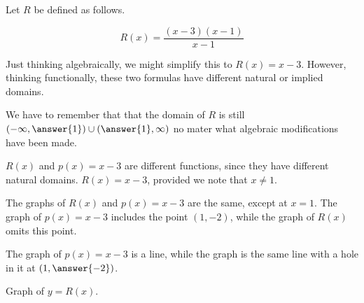 \documentclass{ximera}
\begin{document}
\begin{example}

Let $R$ be defined as follows.


\[   R(x) = \frac{(x-3)(x-1)}{x-1}            \]


Just thinking algebraically, we might simplify this to $R(x) = x-3$. However, thinking functionally, these two formulas have different natural or implied domains.


We have to remember that that the domain of $R$ is still $\left( -\infty, \answer{1} \right) \cup \left( \answer{1},\infty \right)$ no mater what algebraic modifications have been made.

$R(x)$ and $p(x) = x-3$ are different functions, since they have different natural domains. $R(x) = x - 3$, provided we note that $x \ne 1$.


The graphs of $R(x)$ and $p(x) = x-3$ are the same, except at $x=1$.  The graph of $p(x) = x-3$ includes the point $(1, -2)$, while the graph of $R(x)$ omits this point.



The graph of $p(x) = x-3$ is a line, while the graph is the same line with a hole in it at $\left( 1, \answer{-2} \right)$.












Graph of $y = R(x)$.


\begin{image}
\end{image}
\end{example}
\end{document}
